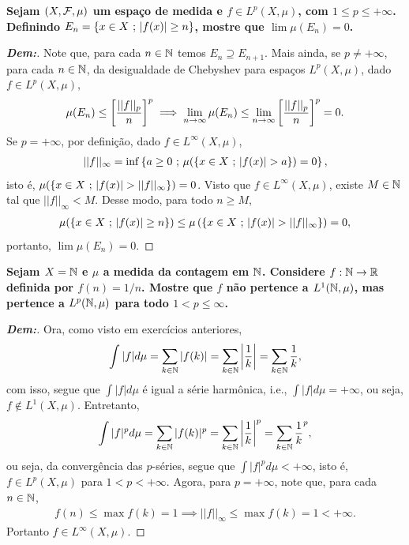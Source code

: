 \textbf{Sejam $(X, \mathcal F, \mu)$ um espaço de medida e $f \in L^p(X, \mu)$, 
com $1 \le p \le +\infty$. Definindo $E_n = \left\{x \in X \text{ ; } |f(x)| \ge n\right\}$, 
mostre que $\lim \mu(E_n) = 0$.}
\begin{proof}[\textbf{Dem:}] Note que, para cada $n \in \mathbb N$ temos 
$E_n \supseteq E_{n+1}$. Mais ainda, se $p \neq +\infty$, para cada $n \in \mathbb N$, 
  da desigualdade de Chebyshev para espaços $L^p(X, \mu)$, dado $f \in L^p(X, \mu)$, 
\begin{align*}
  \mu(E_n) \le \left[\frac{||f||_p}{n}\right]^p \implies 
  \lim_{n \rightarrow \infty} \mu(E_n) \le 
  \lim_{n \rightarrow \infty} \left[\frac{||f||_p}{n}\right]^p = 0. 
\end{align*}
Se $p = +\infty$, por definição, dado $f \in L^\infty(X, \mu)$, 
\begin{align*}
  ||f||_\infty = \inf \left\{a \ge 0 \text{ ; } \mu(\left\{x \in X \text{ ; } |f(x)| > a\right\}) = 0\right\},
\end{align*}
  isto é, $\mu(\left\{x \in X \text{ ; } |f(x)| > ||f||_\infty\right\}) = 0$.  
  Visto que $f \in L^\infty(X, \mu)$, existe $M \in \mathbb N$ tal que 
$||f||_\infty < M$. Desse modo, para todo $n \ge M$,
\begin{align*}
  \mu(\left\{x \in X \text{ ; } |f(x)| \ge n\right\}) \le 
  \mu\left(\left\{x \in X \text{ ; } |f(x)| > ||f||_\infty\right\}\right) = 0,
\end{align*}
  portanto, $\lim \mu(E_n) = 0$.
\end{proof}

\textbf{Sejam $X = \mathbb N$ e $\mu$ a medida da contagem em $\mathbb N$. 
Considere $f: \mathbb N \rightarrow \mathbb R$ definida por $f(n)=1/n$. Mostre que 
$f$ não pertence a $L^1(\mathbb N, \mu)$, mas pertence a $L^p(\mathbb N, \mu)$ 
para todo $1 < p \le \infty$.}
\begin{proof}[\textbf{Dem:}] Ora, como visto em exercícios anteriores, 
\begin{align*}
  \int |f| d\mu = \sum_{k \in \mathbb N} |f(k)| = \sum_{k \in \mathbb N} \left|\frac{1}{k}\right| 
  = \sum_{k \in \mathbb N} \frac{1}{k},
\end{align*}
com isso, segue que $\int |f| d\mu$ é igual a série harmônica, i.e., $\int |f| d\mu = +\infty$,
  ou seja, $f \not \in L^1(X, \mu)$. 
  Entretanto, 
\begin{align*}
  \int |f|^p d\mu = \sum_{k \in \mathbb N} |f(k)|^p = \sum_{k \in \mathbb N} \left|\frac{1}{k}\right|^p 
  = \sum_{k \in \mathbb N} \frac{1}{k}^p,
\end{align*}
ou seja, da convergência das $p$-séries, segue que $\int |f|^p d\mu < +\infty$, 
  isto é, $f \in L^p(X, \mu)$ para 
  $1 < p < +\infty$. Agora, para $p = +\infty$, note que, para cada $n \in \mathbb N$, 
\begin{align*}
  f(n) \le \max f(k) = 1 \implies ||f||_\infty \le \max f(k) = 1 < +\infty. 
\end{align*}
  Portanto $f \in L^\infty(X, \mu)$.
\end{proof}

